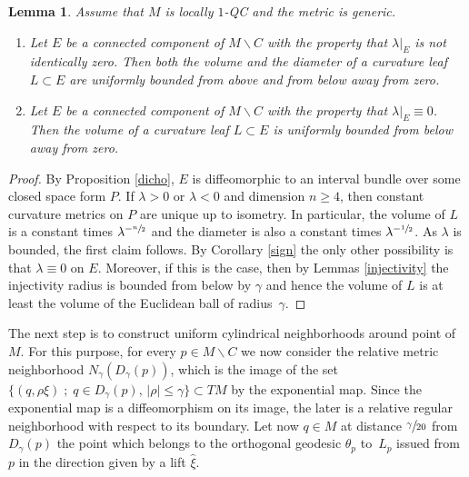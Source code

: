 \documentclass[10pt]{amsart}
\let\moins\smallsetminus
\newcommand{\sep}{\;;\;}
\newtheorem{lemma}[theorem]{Lemma}
\theoremstyle{definition}
\theoremstyle{remark}
\numberwithin{equation}{section}
\begin{document}
\begin{lemma}\label{bdvolume}
Assume that $M$ is locally $1$-QC and the metric is generic.
\begin{enumerate}
\item Let $E$ be a connected component of $M\moins C$ with the property that $\lambda|_E$ is not identically zero.
Then both the volume and the diameter of a curvature leaf $L\subset E$ are uniformly bounded
from above and from below away from zero.
\item Let $E$ be a connected component of $M\moins C$ with the property that $\lambda|_E\equiv 0$. Then
the volume of a curvature leaf $L\subset E$ is uniformly bounded from below away from zero.
\end{enumerate}
\end{lemma}
\begin{proof}
By Proposition \ref{dicho}, $E$ is diffeomorphic to an interval bundle over some closed space form $P$.
If $\lambda >0$ or $\lambda <0$ and dimension $n\geq4$, then constant curvature metrics on $P$ are unique up to
isometry. In particular, the volume of $L$ is a constant times $\lambda^{-\sfrac{n}{2}}$ and the diameter
is also a constant times $\lambda^{-\sfrac{1}{2}}$. As $\lambda$ is bounded, the first claim follows.
By Corollary \ref{sign} the only other possibility is that $\lambda\equiv 0$ on $E$.
Moreover, if this is the case, then by Lemmas \ref{injectivity} the injectivity radius is bounded from below by $\gamma$ and hence
the volume of $L$ is at least the volume of the Euclidean ball of radius~$\gamma$.
\end{proof}

The next step is to construct uniform cylindrical neighborhoods around point of~$M$.
For this purpose, for every $p\in M\moins C$ we now consider the relative metric neighborhood $N_{\gamma}(D_{\gamma}(p))$, which is the image of the set $\{(q, \rho\xi)\sep q\in D_{\gamma}(p),\, |\rho| \leq \gamma\}\subset TM$ by
the exponential map. Since the exponential map is a diffeomorphism on its image, the later is a
relative regular neighborhood with respect to its boundary.
Let now $q\in M$ at distance $\sfrac{\gamma}{20}$ from $D_{\gamma}(p)$ the point which belongs to the
orthogonal geodesic $\theta_p$ to~$L_p$ issued from $p$ in the direction given by a lift $\widehat{\xi}$.
\end{document}
